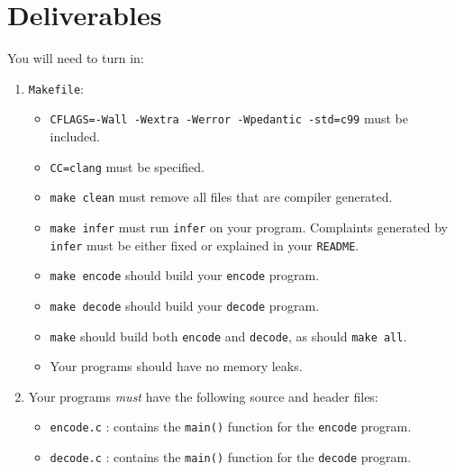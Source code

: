 \documentclass{article}
\begin{document}
\newpage

\section{Deliverables}
You will need to turn in:

\begin{enumerate}
    \item \texttt{Makefile}:
        \begin{itemize}
            \item \texttt{CFLAGS=-Wall -Wextra -Werror -Wpedantic -std=c99} must
                be included.

            \item \texttt{CC=clang} must be specified.

            \item \texttt{make clean} must remove all files that are compiler
                generated.

            \item \texttt{make infer} must run \texttt{infer} on your program.
                Complaints generated by \texttt{infer} must be either fixed or
                explained in your \texttt{README}.

            \item \texttt{make encode} should build your \texttt{encode}
                program.

            \item \texttt{make decode} should build your \texttt{decode}
                program.

            \item \texttt{make} should build both \texttt{encode} and
                \texttt{decode}, as should \texttt{make all}.

            \item Your programs should have no memory leaks.
        \end{itemize}

    \item Your programs \emph{must} have the following source and header files:
        \begin{itemize}
            \item \texttt{encode.c} : contains the \texttt{main()} function for
                the \texttt{encode} program.

            \item \texttt{decode.c} : contains the \texttt{main()} function for
                the \texttt{decode} program.


\end{itemize}
\end{enumerate}
\end{document}
